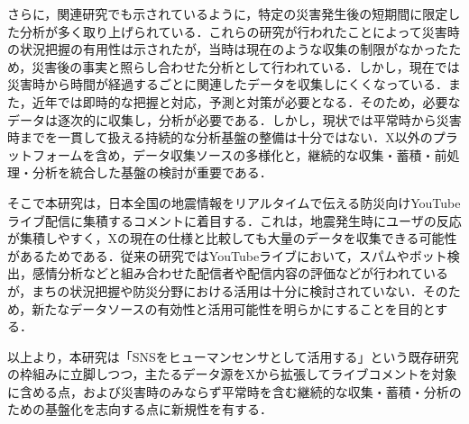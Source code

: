 さらに，関連研究でも示されているように，特定の災害発生後の短期間に限定した分析が多く取り上げられている．これらの研究が行われたことによって災害時の状況把握の有用性は示されたが，当時は現在のような収集の制限がなかったため，災害後の事実と照らし合わせた分析として行われている．しかし，現在では災害時から時間が経過するごとに関連したデータを収集しにくくなっている．また，近年では即時的な把握と対応，予測と対策が必要となる．そのため，必要なデータは逐次的に収集し，分析が必要である．しかし，現状では平常時から災害時までを一貫して扱える持続的な分析基盤の整備は十分ではない．X以外のプラットフォームを含め，データ収集ソースの多様化と，継続的な収集・蓄積・前処理・分析を統合した基盤の検討が重要である．

そこで本研究は，日本全国の地震情報をリアルタイムで伝える防災向けYouTubeライブ配信に集積するコメントに着目する．これは，地震発生時にユーザの反応が集積しやすく，Xの現在の仕様と比較しても大量のデータを収集できる可能性があるためである．従来の研究ではYouTubeライブにおいて，スパムやボット検出，感情分析などと組み合わせた配信者や配信内容の評価などが行われているが，まちの状況把握や防災分野における活用は十分に検討されていない．そのため，新たなデータソースの有効性と活用可能性を明らかにすることを目的とする．

以上より，本研究は「SNSをヒューマンセンサとして活用する」という既存研究の枠組みに立脚しつつ，主たるデータ源をXから拡張してライブコメントを対象に含める点，および災害時のみならず平常時を含む継続的な収集・蓄積・分析のための基盤化を志向する点に新規性を有する．
